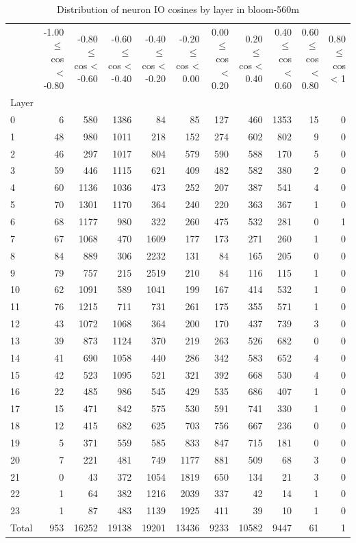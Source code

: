\begin{table}
\caption{Distribution of neuron IO cosines by layer in bloom-560m}
\label{tab:bloom-560m_half_coarse}
\begin{tabular}{lrrrrrrrrrr}
 & -1.00 $\leq$ cos < -0.80 & -0.80 $\leq$ cos < -0.60 & -0.60 $\leq$ cos < -0.40 & -0.40 $\leq$ cos < -0.20 & -0.20 $\leq$ cos < 0.00 & 0.00 $\leq$ cos < 0.20 & 0.20 $\leq$ cos < 0.40 & 0.40 $\leq$ cos < 0.60 & 0.60 $\leq$ cos < 0.80 & 0.80 $\leq$ cos < 1 \\
Layer &  &  &  &  &  &  &  &  &  &  \\
0 & 6 & 580 & 1386 & 84 & 85 & 127 & 460 & 1353 & 15 & 0 \\
1 & 48 & 980 & 1011 & 218 & 152 & 274 & 602 & 802 & 9 & 0 \\
2 & 46 & 297 & 1017 & 804 & 579 & 590 & 588 & 170 & 5 & 0 \\
3 & 59 & 446 & 1115 & 621 & 409 & 482 & 582 & 380 & 2 & 0 \\
4 & 60 & 1136 & 1036 & 473 & 252 & 207 & 387 & 541 & 4 & 0 \\
5 & 70 & 1301 & 1170 & 364 & 240 & 220 & 363 & 367 & 1 & 0 \\
6 & 68 & 1177 & 980 & 322 & 260 & 475 & 532 & 281 & 0 & 1 \\
7 & 67 & 1068 & 470 & 1609 & 177 & 173 & 271 & 260 & 1 & 0 \\
8 & 84 & 889 & 306 & 2232 & 131 & 84 & 165 & 205 & 0 & 0 \\
9 & 79 & 757 & 215 & 2519 & 210 & 84 & 116 & 115 & 1 & 0 \\
10 & 62 & 1091 & 589 & 1041 & 199 & 167 & 414 & 532 & 1 & 0 \\
11 & 76 & 1215 & 711 & 731 & 261 & 175 & 355 & 571 & 1 & 0 \\
12 & 43 & 1072 & 1068 & 364 & 200 & 170 & 437 & 739 & 3 & 0 \\
13 & 39 & 873 & 1124 & 370 & 219 & 263 & 526 & 682 & 0 & 0 \\
14 & 41 & 690 & 1058 & 440 & 286 & 342 & 583 & 652 & 4 & 0 \\
15 & 42 & 523 & 1095 & 521 & 321 & 392 & 668 & 530 & 4 & 0 \\
16 & 22 & 485 & 986 & 545 & 429 & 535 & 686 & 407 & 1 & 0 \\
17 & 15 & 471 & 842 & 575 & 530 & 591 & 741 & 330 & 1 & 0 \\
18 & 12 & 415 & 682 & 625 & 703 & 756 & 667 & 236 & 0 & 0 \\
19 & 5 & 371 & 559 & 585 & 833 & 847 & 715 & 181 & 0 & 0 \\
20 & 7 & 221 & 481 & 749 & 1177 & 881 & 509 & 68 & 3 & 0 \\
21 & 0 & 43 & 372 & 1054 & 1819 & 650 & 134 & 21 & 3 & 0 \\
22 & 1 & 64 & 382 & 1216 & 2039 & 337 & 42 & 14 & 1 & 0 \\
23 & 1 & 87 & 483 & 1139 & 1925 & 411 & 39 & 10 & 1 & 0 \\
Total & 953 & 16252 & 19138 & 19201 & 13436 & 9233 & 10582 & 9447 & 61 & 1 \\
\end{tabular}
\end{table}
